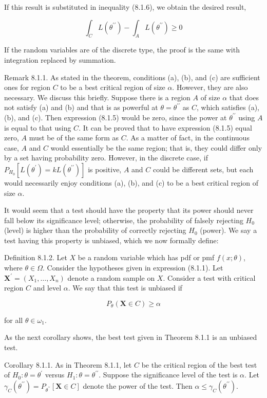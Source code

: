 If this result is substituted in inequality (8.1.6), we obtain the desired result,

$$
\int_{C} L\left(\theta^{\prime \prime}\right)-\int_{A} L\left(\theta^{\prime \prime}\right) \geq 0
$$

If the random variables are of the discrete type, the proof is the same with integration replaced by summation.

Remark 8.1.1. As stated in the theorem, conditions (a), (b), and (c) are sufficient ones for region $C$ to be a best critical region of size $\alpha$. However, they are also necessary. We discuss this briefly. Suppose there is a region $A$ of size $\alpha$ that does not satisfy (a) and (b) and that is as powerful at $\theta=\theta^{\prime \prime}$ as $C$, which satisfies (a), (b), and (c). Then expression (8.1.5) would be zero, since the power at $\theta^{\prime \prime}$ using $A$ is equal to that using $C$. It can be proved that to have expression (8.1.5) equal zero, $A$ must be of the same form as $C$. As a matter of fact, in the continuous case, $A$ and $C$ would essentially be the same region; that is, they could differ only by a set having probability zero. However, in the discrete case, if $P_{H_{0}}\left[L\left(\theta^{\prime}\right)=k L\left(\theta^{\prime \prime}\right)\right]$ is positive, $A$ and $C$ could be different sets, but each would necessarily enjoy conditions (a), (b), and (c) to be a best critical region of size $\alpha$.

It would seem that a test should have the property that its power should never fall below its significance level; otherwise, the probability of falsely rejecting $H_{0}$ (level) is higher than the probability of correctly rejecting $H_{0}$ (power). We say a test having this property is unbiased, which we now formally define:

Definition 8.1.2. Let $X$ be a random variable which has pdf or pmf $f(x ; \theta)$, where $\theta \in \Omega$. Consider the hypotheses given in expression (8.1.1). Let $\mathbf{X}^{\prime}=\left(X_{1}, \ldots, X_{n}\right)$ denote a random sample on $X$. Consider a test with critical region $C$ and level $\alpha$. We say that this test is unbiased if

$$
P_{\theta}(\mathbf{X} \in C) \geq \alpha
$$

for all $\theta \in \omega_{1}$.

As the next corollary shows, the best test given in Theorem 8.1.1 is an unbiased test.

Corollary 8.1.1. As in Theorem 8.1.1, let $C$ be the critical region of the best test of $H_{0}: \theta=\theta^{\prime}$ versus $H_{1}: \theta=\theta^{\prime \prime}$. Suppose the significance level of the test is $\alpha$. Let $\gamma_{C}\left(\theta^{\prime \prime}\right)=P_{\theta^{\prime \prime}}[\mathbf{X} \in C]$ denote the power of the test. Then $\alpha \leq \gamma_{C}\left(\theta^{\prime \prime}\right)$.

